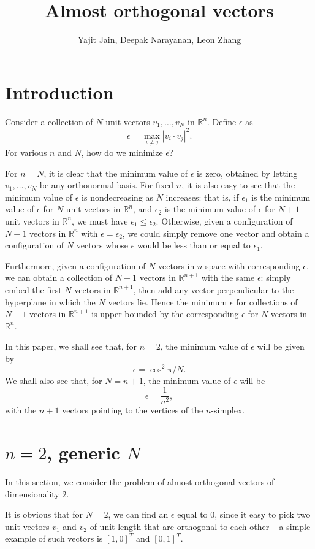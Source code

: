 \documentclass[11pt,letterpaper,twoside,english]{article}
\title{Almost orthogonal vectors}
\author{Yajit Jain, Deepak Narayanan, Leon Zhang}
\theoremstyle{theorem}
\theoremstyle{remark}
\begin{document}
\maketitle

\section{Introduction}
Consider a collection of $N$ unit vectors $v_1, \ldots, v_N$ in $\mathbb R^n$. Define $\epsilon$ as
\[\epsilon=\max_{i\neq j}|v_i\cdot v_j|^2.\]
For various $n$ and $N$, how do we minimize $\epsilon$?

For $n=N$, it is clear that the minimum value of $\epsilon$ is zero, obtained by letting $v_1,\ldots, v_N$ be any orthonormal basis. For fixed $n$, it is also easy to see that the minimum value of $\epsilon$ is nondecreasing as $N$ increases: that is, if $\epsilon_1$ is the minimum value of $\epsilon$ for $N$ unit vectors in $\mathbb R^n$, and $\epsilon_2$ is the minimum value of $\epsilon$ for $N+1$ unit vectors in $\mathbb R^n$, we must have $\epsilon_1\leq \epsilon_2$. Otherwise, given a configuration of $N+1$ vectors in $\mathbb R^n$ with $\epsilon=\epsilon_2$, we could simply remove one vector and obtain a configuration of $N$ vectors whose $\epsilon$ would be less than or equal to $\epsilon_1$.

Furthermore, given a configuration of $N$ vectors in $n$-space with corresponding $\epsilon$, we can obtain a collection of $N+1$ vectors in $\mathbb R^{n+1}$ with the same $\epsilon$: simply embed the first $N$ vectors in $\mathbb R^{n+1}$, then add any vector perpendicular to the hyperplane in which the $N$ vectors lie. Hence the minimum $\epsilon$ for collections of $N+1$ vectors in $\mathbb R^{n+1}$ is upper-bounded by the corresponding $\epsilon$ for $N$ vectors in $\mathbb R^n$.

In this paper, we shall see that, for $n=2$, the minimum value of $\epsilon$ will be given by 
\[\epsilon=\cos^2\pi/N.\] 
We shall also see that, for $N=n+1$, the minimum value of $\epsilon$ will be 
\[\epsilon=\frac{1}{n^2},\] 
with the $n+1$ vectors pointing to the vertices of the $n$-simplex.

\section{$n=2$, generic $N$}
In this section, we consider the problem of almost orthogonal vectors of dimensionality $2$.

It is obvious that for $N=2$, we can find an $\epsilon$ equal to $0$, since it easy to pick two unit vectors $v_1$ and $v_2$ of unit length that are orthogonal to each other -- a simple example of such vectors is $[1, 0]^T$ and $[0, 1]^T$. 
\end{document}
